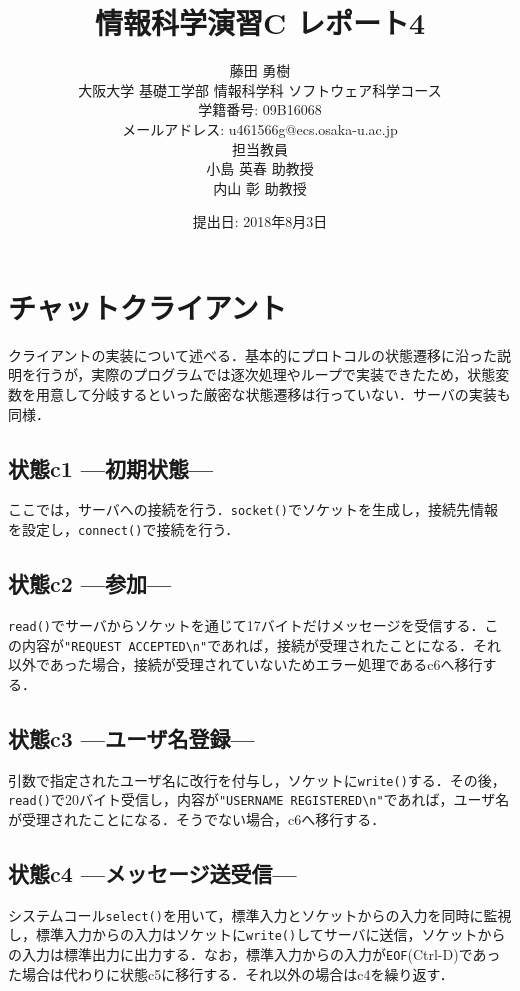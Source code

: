 \documentclass[a4j,10pt,titlepage]{jsarticle}
\title{情報科学演習C レポート4}
\author{藤田 勇樹 \\
大阪大学 基礎工学部 情報科学科 ソフトウェア科学コース\\
学籍番号: 09B16068 \\
メールアドレス: u461566g@ecs.osaka-u.ac.jp \\
担当教員\\
小島 英春 助教授 \\
内山 彰 助教授}
\date{提出日: 2018年8月3日}
\begin{document}
\maketitle
\section{チャットクライアント}
クライアントの実装について述べる．基本的にプロトコルの状態遷移に沿った説明を行うが，実際のプログラムでは逐次処理やループで実装できたため，状態変数を用意して分岐するといった厳密な状態遷移は行っていない．サーバの実装も同様．

\subsection{状態c1 ---初期状態---}
ここでは，サーバへの接続を行う．\verb|socket()|でソケットを生成し，接続先情報を設定し，\verb|connect()|で接続を行う．

\subsection{状態c2 ---参加---}
\verb|read()|でサーバからソケットを通じて17バイトだけメッセージを受信する\footnotemark．この内容が\verb|"REQUEST ACCEPTED\n"|であれば，接続が受理されたことになる．それ以外であった場合，接続が受理されていないためエラー処理であるc6へ移行する．


\subsection{状態c3 ---ユーザ名登録---}
引数で指定されたユーザ名に改行を付与し，ソケットに\verb|write()|する．その後，\verb|read()|で20バイト受信し，内容が\verb|"USERNAME REGISTERED\n"|であれば，ユーザ名が受理されたことになる．そうでない場合，c6へ移行する．

\subsection{状態c4 ---メッセージ送受信---}
システムコール\verb|select()|を用いて，標準入力とソケットからの入力を同時に監視し，標準入力からの入力はソケットに\verb|write()|してサーバに送信，ソケットからの入力は標準出力に出力する．なお，標準入力からの入力が\verb|EOF|(Ctrl-D)であった場合は代わりに状態c5に移行する．それ以外の場合はc4を繰り返す．
\end{document}
